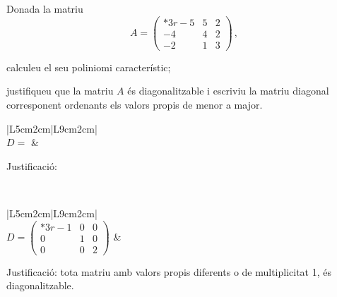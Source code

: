 \documentclass[10pt,catalan]{article}
\begin{document}
\begin{enunciat}
Donada la matriu
\[
   A=\begin{pmatrix}{*{3}r} -5 & 5 & 2\\ -4 & 4 & 2\\ -2 & 1 & 3\end{pmatrix}\,,
\]
\begin{apartats}
\item calculeu el seu poliniomi característic;
\item justifiqueu que la matriu $A$ és diagonalitzable i escriviu la matriu diagonal corresponent  ordenants els valors propis de menor a major.
\end{apartats}
\end{enunciat}

\begin{quadricula}
\begin{tabular}{|L{5cm}{2cm}|L{9cm}{2cm}|}
\hline
{} \\
\hline
$D=$ & \begin{minipage}[t]{8.8cm}Justificació:\vspace{1.8cm} \end{minipage}\\
\hline
\end{tabular}
\end{quadricula}

\begin{solucio}
\begin{center}
\begin{tabular}{|L{5cm}{2cm}|L{9cm}{2cm}|}
\hline
{} \\
\hline
$D=\begin{pmatrix}{*{3}r} -1 & 0 & 0\\ 0 & 1 & 0\\ 0 & 0 & 2\end{pmatrix}$ & 
\begin{minipage}[t]{8.8cm}
Justificació: tota matriu amb valors propis diferents o de multiplicitat 1, és diagonalitzable.
\vspace{1cm}
\end{minipage} \\
\hline
\end{tabular}
\end{center}
\end{solucio}
\end{document}
